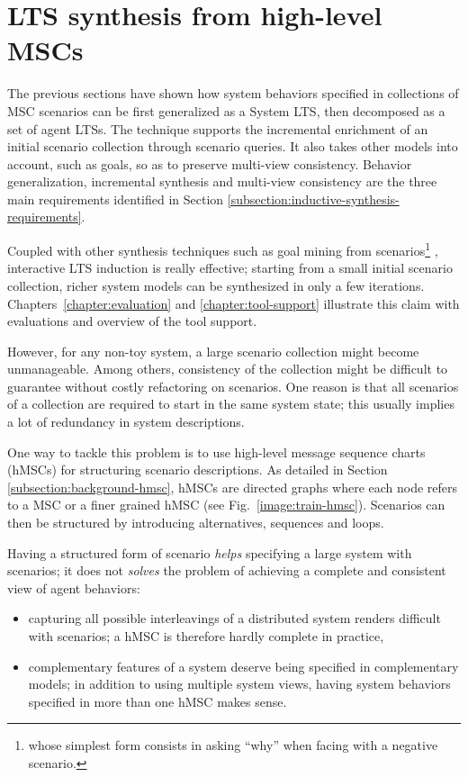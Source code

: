 \section{LTS synthesis from high-level MSCs\label{section:inductive-from-hMSC}}

The previous sections have shown how system behaviors specified in collections of MSC scenarios can be first generalized as a System LTS, then decomposed as a set of agent LTSs. The technique supports the incremental enrichment of an initial scenario collection through scenario queries. It also takes other models into account, such as goals, so as to preserve multi-view consistency. Behavior generalization, incremental synthesis and multi-view consistency are the three main requirements identified in Section \ref{subsection:inductive-synthesis-requirements}. 

Coupled with other synthesis techniques such as goal mining from scenarios\footnote{whose simplest form consists in asking ``why'' when facing with a negative scenario.} \cite{Damas:2006}, interactive LTS induction is really effective; starting from a small initial scenario collection, richer system models can be synthesized in only a few iterations. Chapters~\ref{chapter:evaluation} and \ref{chapter:tool-support} illustrate this claim with evaluations and overview of the tool support.

However, for any non-toy system, a large scenario collection might become unmanageable. Among others, consistency of the collection might be difficult to guarantee without costly refactoring on scenarios. One reason is that all scenarios of a collection are required to start in the same system state; this usually implies a lot of redundancy in system descriptions.

One way to tackle this problem is to use high-level message sequence charts (hMSCs) for structuring scenario descriptions. As detailed in Section \ref{subsection:background-hmsc}, hMSCs are directed graphs where each node refers to a MSC or a finer grained hMSC (see Fig.~\ref{image:train-hmsc}). Scenarios can then be structured by introducing alternatives, sequences and loops.

Having a structured form of scenario \emph{helps} specifying a large system with scenarios; it does not \emph{solves} the problem of achieving a complete and consistent view of agent behaviors:
\begin{itemize}
\item capturing all possible interleavings of a distributed system renders difficult with scenarios; a hMSC is therefore hardly complete in practice,
\item complementary features of a system deserve being specified in complementary models; in addition to using multiple system views, having system behaviors specified in more than one hMSC makes sense.
\end{itemize}

